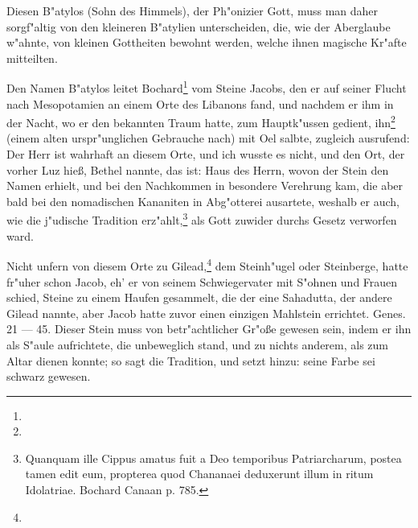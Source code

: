 \documentclass[a4paper, 11pt, oneside, polutonikogreek, german]{article}
\begin{document}
Diesen B"atylos (Sohn des Himmels), der Ph"onizier Gott, muss man daher sorgf"altig von den kleineren B"atylien unterscheiden, die, wie der Aberglaube w"ahnte, von kleinen Gottheiten bewohnt werden, welche ihnen magische Kr"afte mitteilten.

Den Namen B"atylos leitet Bochard\footnote{} vom Steine Jacobs, den er auf seiner Flucht nach Mesopotamien an einem Orte des Libanons fand, und nachdem er ihm in der Nacht, wo er den bekannten Traum hatte, zum Hauptk"ussen gedient, ihn\footnote{} (einem alten urspr"unglichen Gebrauche nach) mit Oel salbte, zugleich ausrufend: Der Herr ist wahrhaft an diesem Orte, und ich wusste es nicht, und den Ort, der vorher Luz hieß, Bethel nannte, das ist: Haus des Herrn, wovon der Stein den Namen erhielt, und bei den Nachkommen in besondere Verehrung kam, die aber bald bei den nomadischen Kananiten in Abg"otterei ausartete, weshalb er auch, wie die j"udische Tradition erz"ahlt,\footnote{Quanquam ille Cippus amatus fuit a Deo temporibus Patriarcharum, postea tamen edit eum, propterea quod Chananaei deduxerunt illum in ritum Idolatriae. Bochard Canaan p. 785.} als Gott zuwider durchs Gesetz verworfen ward.

Nicht unfern von diesem Orte zu Gilead,\footnote{} dem Steinh"ugel oder Steinberge, hatte fr"uher schon Jacob, eh' er von seinem Schwiegervater mit S"ohnen und Frauen schied, Steine zu einem Haufen gesammelt, die der eine Sahadutta, der andere Gilead nannte, aber Jacob hatte zuvor einen einzigen Mahlstein errichtet. Genes. 21 --- 45. Dieser Stein muss von betr"achtlicher Gr"oße gewesen sein, indem er ihn als S"aule aufrichtete, die unbeweglich stand, und zu nichts anderem, als zum Altar dienen konnte; so sagt die Tradition, und setzt hinzu: seine Farbe sei schwarz gewesen.
\end{document}
